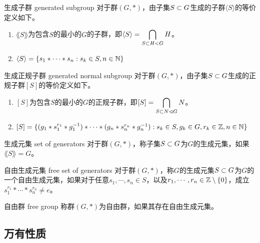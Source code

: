 \begin{definition}{生成子群 generated subgroup}
	对于群$(G,*)$，由子集$S\subset G$生成的子群$\langle S \rangle$的等价定义如下。
	\begin{enumerate}
		\item $\lang S \rang$为包含$S$的最小的$G$的子群，即$\displaystyle\langle S \rangle =\bigcap_{S\subset H<G}H$。
		\item $\langle S \rangle=\{ s_1*\cdots*s_n:s_k\in S ,n\in\mathbb{N}\}$
	\end{enumerate}
\end{definition}

\begin{definition}{生成正规子群 generated normal subgroup}
	对于群$(G,*)$，由子集$S\subset G$生成的正规子群$[S]$的等价定义如下。
	\begin{enumerate}
		\item $[S]$为包含$S$的最小的$G$的正规子群，即$\displaystyle[S]=\bigcap_{S\subset N\lhd G}N$。
		\item $[S]=\{ (g_1*s_1^{r_1}*g_1^{-1})*\cdots *(g_n*s_n^{r_n}*g_n^{-1}):s_k\in S,g_k\in G,r_k\in\mathbb{Z},n\in\mathbb{N} \}$
	\end{enumerate}
\end{definition}

\begin{definition}{生成元集 set of generators}
	对于群$(G,*)$，称子集$S\subset G$为$G$的生成元集，如果$\lang S \rang =G$。
\end{definition}

\begin{definition}{自由生成元集 free set of generators}
	对于群$(G,*)$，称$G$的生成元集$S\subset G$为$G$的一个自由生成元集，如果对于任意$s_1,\cdots,s_n\in S$，以及$r_1,\cdots,r_n\in\mathbb{Z}\setminus\{0\}$，成立$s_1^{r_1}*\cdots*s_n^{r_n}\ne e$。
\end{definition}

\begin{definition}{自由群 free group}
	称群$(G,*)$为自由群，如果其存在自由生成元集。
\end{definition}

\subsection{万有性质}

